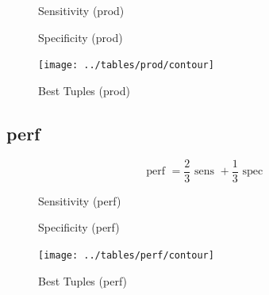 \documentclass[10pt]{article}
\newcommand{\sens}{\mbox{ sens }}
\newcommand{\spec}{\mbox{ spec }}
\begin{document}
\begin{multicols}{2}
	\begin{figure}[H]
		\center
		
		\caption{Sensitivity (prod)}
	\end{figure}

	\begin{figure}[H]
		\center
		
		\caption{Specificity (prod)}
	\end{figure}
	
	\begin{figure}[H]
		\texttt{[image: ../tables/prod/contour]}
	\end{figure}
\end{multicols}

\vspace{2em}

\begin{figure}[H]
	\center
	
	\caption{Best Tuples (prod)}
\end{figure}

\pagebreak
\subsection{perf}
\vspace{1em}
\begin{equation}
	\mbox{perf } = \frac{2}{3}\sens + \frac{1}{3}\spec
\end{equation}
\vspace{1em}

\begin{multicols}{2}
	\begin{figure}[H]
		\center
		
		\caption{Sensitivity (perf)}
	\end{figure}

	\begin{figure}[H]
		\center
		
		\caption{Specificity (perf)}
	\end{figure}
	
	\begin{figure}[H]
		\texttt{[image: ../tables/perf/contour]}
	\end{figure}
\end{multicols}

\vspace{2em}

\begin{figure}[H]
	\center
	
	\caption{Best Tuples (perf)}
\end{figure}
\end{document}
